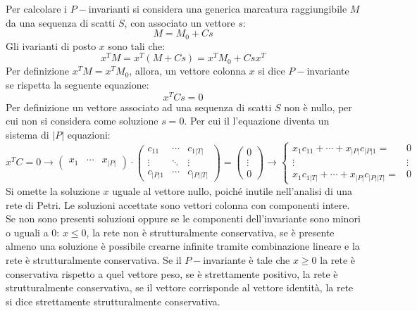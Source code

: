 \documentclass{article}
\numberwithin{equation}{subsection}
\begin{document}
Per calcolare i $P-$invarianti si considera una generica marcatura raggiungibile $M$ da una sequenza di scatti $S$, con associato un vettore $s$:
\begin{equation*}
    M=M_0+Cs
\end{equation*}
Gli ivarianti di posto $x$ sono tali che:
\begin{equation*}
    x^TM=x^T(M+Cs)=x^TM_0+Csx^T
\end{equation*}
Per definizione $x^TM=x^TM_0$, allora, un vettore colonna $x$ si dice $P-$invariante se rispetta la seguente equazione:
\begin{equation*}
    x^TCs=0
\end{equation*}
Per definizione un vettore associato ad una sequenza di scatti $S$ non è nullo, per cui non si considera come soluzione $s=0$. Per cui il l'equazione diventa un sistema 
di $|P|$ equazioni: 
\begin{equation*}
    x^TC=0\to\begin{pmatrix}
        x_1 & \cdots & x_{|P|}
    \end{pmatrix}\cdot\begin{pmatrix}
        c_{11} & \cdots & c_{1|T|}\\
        \vdots & \ddots & \vdots\\
        c_{|P|1} & \cdots & c_{|P||T|}
    \end{pmatrix}=\begin{pmatrix}
        0\\
        \vdots\\
        0
    \end{pmatrix}\to\begin{cases}
        x_1c_{11}+\cdots+x_{|P|}c_{|P|1}=&0\\
        \vdots &\vdots\\
        x_1c_{1|T|}+\cdots+x_{|P|}c_{|P||T|}=&0
    \end{cases}
\end{equation*}
Si omette la soluzione $x$ uguale al vettore nullo, poiché inutile nell'analisi di una rete di Petri. Le soluzioni accettate sono vettori colonna con componenti intere. Se 
non sono presenti soluzioni oppure se le componenti dell'invariante sono minori o uguali a $0$: $x\leq0$, la rete non è strutturalmente conservativa, se è presente almeno una 
soluzione è possibile crearne infinite tramite combinazione lineare e la rete è strutturalmente conservativa. Se il $P-$invariante è tale che $x\geq0$ la rete è conservativa 
rispetto a quel vettore peso, se è strettamente positivo, la rete è strutturalmente conservativa, se il vettore corrisponde al vettore identità, la rete si dice strettamente 
strutturalmente conservativa.  
\end{document}
